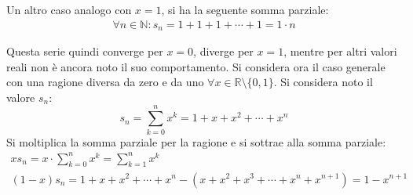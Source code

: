 \documentclass{article}
\numberwithin{equation}{subsection}
\begin{document}
Un altro caso analogo con $x=1$, si ha la seguente somma parziale:
\begin{gather*}
    \forall n\in\mathbb{N}: s_n=1+1+1+\cdots+1=1\cdot n
\end{gather*}

Questa serie quindi converge per $x=0$, diverge per $x=1$, mentre per altri valori reali non è ancora noto il suo comportamento. 
Si considera ora il caso generale con una ragione diversa da zero e da uno $\forall x\in\mathbb{R}\setminus\{0,1\}$. 
Si considera noto il valore $s_n$:
\begin{equation*}
    s_n=\displaystyle\sum_{k=0}^n x^k=1+x+x^2+\cdots+x^n    
\end{equation*}
Si moltiplica la somma parziale per la ragione e si sottrae alla somma parziale:
\begin{gather*}
    xs_n=x\cdot\displaystyle\sum_{k=0}^n x^k=\sum_{k=1}^nx^k\\
    (1-x)s_n=1+x+x^2+\cdots+x^n-\left(x+x^2+x^3+\cdots+x^n+x^{n+1}\right)=1-x^{n+1}
\end{gather*}
\end{document}
